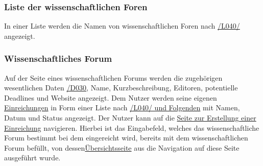 \subsubsection{Liste der wissenschaftlichen Foren}
\begin{description}
     In einer Liste werden die Namen von wissenschaftlichen Foren nach \hyperref[leist:40]{/L040/}
    angezeigt.
\end{description}

\subsubsection{Wissenschaftliches Forum} \label{nut:wissfor}
\begin{description}
     Auf der Seite eines wissenschaftlichen Forums werden die zugehörigen wesentlichen Daten \hyperref[d030]{/D030},
    Name, Kurzbeschreibung, Editoren, potentielle Deadlines und Website angezeigt.
     Dem Nutzer werden seine eigenen \hyperref[nut:ein]{Einreichungen} in Form einer Liste  nach \hyperref[leist:40]{/L040/ und Folgenden}
    mit Namen, Datum und Status angezeigt.
     Der Nutzer kann auf die \hyperref[nut:eein]{Seite zur Erstellung einer Einreichung} navigieren. Hierbei ist
    das Eingabefeld, welches das wissenschaftliche Forum bestimmt bei dem eingereicht wird, bereits mit
    dem wissenschaftlichen Forum befüllt, von dessen\hyperref[nut:wissFor]{Übersichtsseite} aus die Navigation auf diese
    Seite ausgeführt wurde.
\end{description}

